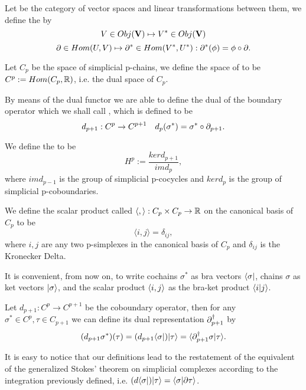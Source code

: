 \documentclass[../1.tex]{subfiles}
\begin{document}
    \begin{defn}
        Let  be the category of vector spaces and linear transformations between them, we define the  by
        \[ V \in Obj(\textbf{V}) \mapsto V^* \in Obj(\textbf{V}) \]
        \[ \partial \in Hom(U,V) \mapsto \partial^* \in Hom(V^*,U^*) : \partial^*(\phi)=\phi \circ \partial . \]
    \end{defn}

    \begin{defn}
        Let $C_p$ be the space of simplicial p-chains, we define the space of  to 
        be $C^p := Hom(C_p, \mathbb{R})$, i.e. the dual space of $C_p$.
    \end{defn}

    \begin{defn}
        By means of the dual functor we are able to define the dual of the boundary operator which we shall call
        , which is defined to be 
        \[ d_{p+1} : C^p \to C^{p+1} \quad d_p(\sigma^*) = \sigma^* \circ \partial_{p+1} .\]
    \end{defn}

    \begin{defn}
        We define the  to be 
        \[H^p := \frac{ker d_{p+1}}{im d_{p}},\] 
        where $im d_{p-1}$ is the group of simplicial p-cocycles and
        $ker d_p$ is the group of simplicial p-coboundaries.
    \end{defn}

    \begin{defn}
        We define the scalar product called  $\langle, \rangle : C_p \times C_p \to \mathbb{R}$ on the canonical basis of $C_p$ to be 
        \[ \langle i, j \rangle = \delta_{ij} ,\] 
        where $i,j$ are any two p-simplexes in the canonical basis of $C_p$ and $\delta_{ij}$ is the Kronecker Delta.
    \end{defn}
    It is convenient, from now on,  to write cochains $\sigma^*$ as bra vectors $\langle \sigma |$, chains $\sigma$ as ket vectors $| \sigma \rangle$,
    and the scalar product $\langle i, j \rangle$ as the bra-ket product $\langle i | j \rangle$.

    \begin{defn}
        Let $d_{p+1} : C^p \to C^{p+1}$ be the coboundary operator, then for any $\sigma^* \in C^p, \tau \in C_{p+1}$ we can define its dual representation $\partial^\dagger_{p+1}$ by
        \[ (d_{p+1} \sigma^*)(\tau) = (d_{p+1} \langle \sigma |)| \tau \rangle = \langle \partial^\dagger_{p+1} \sigma | \tau \rangle. \]
    \end{defn}
    It is easy to notice that our definitions lead to the restatement of the equivalent of the generalized Stokes' theorem on simplicial complexes
    according to the integration previously defined, i.e. $(d\langle \sigma |)| \tau \rangle = \langle \sigma | \partial\tau \rangle$.
   
\end{document}
